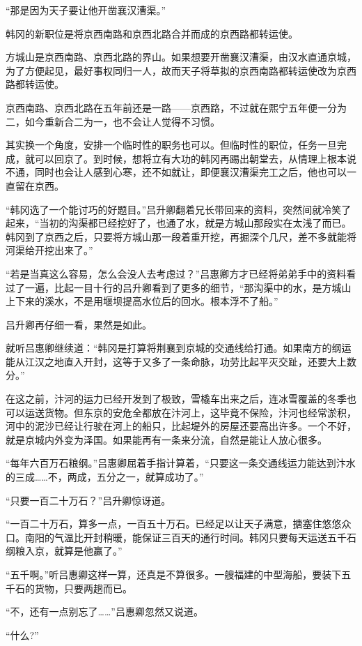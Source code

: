 “那是因为天子要让他开凿襄汉漕渠。”

韩冈的新职位是将京西南路和京西北路合并而成的京西路都转运使。

方城山是京西南路、京西北路的界山。如果想要开凿襄汉漕渠，由汉水直通京城，为了方便起见，最好事权同归一人，故而天子将草拟的京西南路都转运使改为京西路都转运使。

京西南路、京西北路在五年前还是一路——京西路，不过就在熙宁五年便一分为二，如今重新合二为一，也不会让人觉得不习惯。

其实换一个角度，安排一个临时性的职务也可以。但临时性的职位，任务一旦完成，就可以回京了。到时候，想将立有大功的韩冈再踢出朝堂去，从情理上根本说不通，同时也会让人感到心寒，还不如就让，即便襄汉漕渠完工之后，他也可以一直留在京西。

“韩冈选了一个能讨巧的好题目。”吕升卿翻着兄长带回来的资料，突然间就冷笑了起来，“当初的沟渠都已经挖好了，也通了水，就是方城山那段实在太浅了而已。韩冈到了京西之后，只要将方城山那一段着重开挖，再掘深个几尺，差不多就能将河渠给开挖出来了。”

“若是当真这么容易，怎么会没人去考虑过？”吕惠卿方才已经将弟弟手中的资料看过了一遍，比起一目十行的吕升卿看到了更多的细节，“那沟渠中的水，是方城山上下来的溪水，不是用堰坝提高水位后的回水。根本浮不了船。”

吕升卿再仔细一看，果然是如此。

就听吕惠卿继续道：“韩冈是打算将荆襄到京城的交通线给打通。如果南方的纲运能从江汉之地直入开封，这等于又多了一条命脉，功劳比起平灭交趾，还要大上数分。”

在这之前，汴河的运力已经开发到了极致，雪橇车出来之后，连冰雪覆盖的冬季也可以运送货物。但东京的安危全都放在汴河上，这毕竟不保险，汴河也经常淤积，河中的泥沙已经让行驶在河上的船只，比起堤外的房屋还要高出许多。一个不好，就是京城内外变为泽国。如果能再有一条来分流，自然是能让人放心很多。

“每年六百万石粮纲。”吕惠卿屈着手指计算着，“只要这一条交通线运力能达到汴水的三成……不，两成，五分之一，就算成功了。”

“只要一百二十万石？”吕升卿惊讶道。

“一百二十万石，算多一点，一百五十万石。已经足以让天子满意，搪塞住悠悠众口。南阳的气温比开封稍暖，能保证三百天的通行时间。韩冈只要每天运送五千石纲粮入京，就算是他赢了。”

“五千啊。”听吕惠卿这样一算，还真是不算很多。一艘福建的中型海船，要装下五千石的货物，只要两趟而已。

“不，还有一点别忘了……”吕惠卿忽然又说道。

“什么?”

